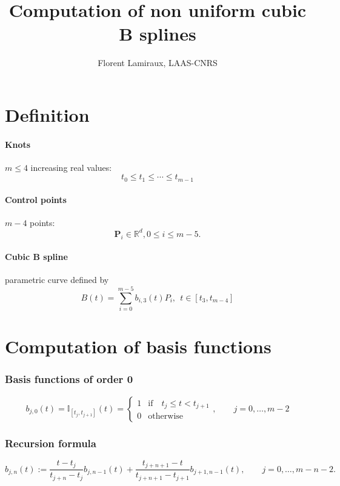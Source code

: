 \documentclass {article}
\title {Computation of non uniform cubic B splines}
\author {Florent Lamiraux, LAAS-CNRS}
\begin{document}
\maketitle
\section {Definition}

\paragraph {Knots} $m \leq 4$ increasing real values:
$$
t_0 \leq t_1 \leq \cdots \leq t_{m-1} 
$$
\paragraph {Control points} $m-4$ points:
$$
\mathbf{P}_{i} \in \mathbb{R}^d, 0\leq i \leq m-5.
$$
\paragraph {Cubic B spline} parametric curve defined by
\begin{equation}\label{eq:spline-definition}
B(t) = \sum_{i=0}^{m-5} b_{i,3} (t) P_i,\ \ t\in [t_3,t_{m-4}]
\end{equation}

\section {Computation of basis functions}

\subsubsection* {Basis functions of order 0}

\begin{equation}\label {eq:basis-0}
b_{j,0}(t) = \mathbb{I}_{[t_j, t_{j+1}]}(t) = \left\{ \begin{matrix} 1 & \mathrm{if} \quad t_j \leq t < t_{j+1} \\ 0 & \mathrm{otherwise} \end{matrix} \right.,\qquad j=0,\ldots, m-2
\end{equation}

\subsubsection* {Recursion formula}

\begin{equation}\label {eq:recursion}
b_{j,n}(t) := \frac{t - t_j}{t_{j+n} - t_j} b_{j,n-1}(t) + \frac{t_{j+n+1} - t}{t_{j+n+1} - t_{j+1}} b_{j+1,n-1}(t) ,\qquad j=0,\ldots, m-n-2. 
\end{equation}
\end{document}
